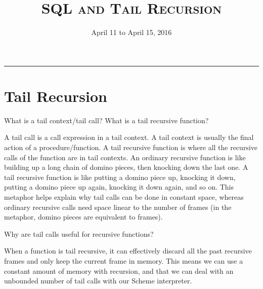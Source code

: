 \documentclass{exam}
\title{\textsc{SQL and Tail Recursion}}
\date{April 11 to April 15, 2016}
\begin{document}
\maketitle
\rule{\textwidth}{0.15em}
\fontsize{12}{15}\selectfont


\section{Tail Recursion}
\begin{questions}
\begin{blocksection}
\question What is a tail context/tail call? What is a tail recursive function?
\begin{solution}[0.5in]
A tail call is a call expression in a tail context. A tail context is usually the final action of a procedure/function.\newline
\newline
A tail recursive function is where all the recursive calls of the function are in tail contexts. \newline
\newline
An ordinary recursive function is like building up a long chain of domino pieces, then knocking down the last one. A tail recursive function is like putting a domino piece up, knocking it down, putting a domino piece up again, knocking it down again, and so on. This metaphor helps explain why tail calls can be done in constant space, whereas ordinary recursive calls need space linear to the number of frames (in the metaphor, domino pieces are equivalent to frames).
\end{solution}
\question Why are tail calls useful for recursive functions?
\begin{solution}[0.5in]
When a function is tail recursive, it can effectively discard all the past recursive frames and only keep the current frame in memory. This means we can use a constant amount of memory with recursion, and that we can deal with an unbounded number of tail calls with our Scheme interpreter.
\end{solution}
\end{blocksection}


\end{questions}
\end{document}
